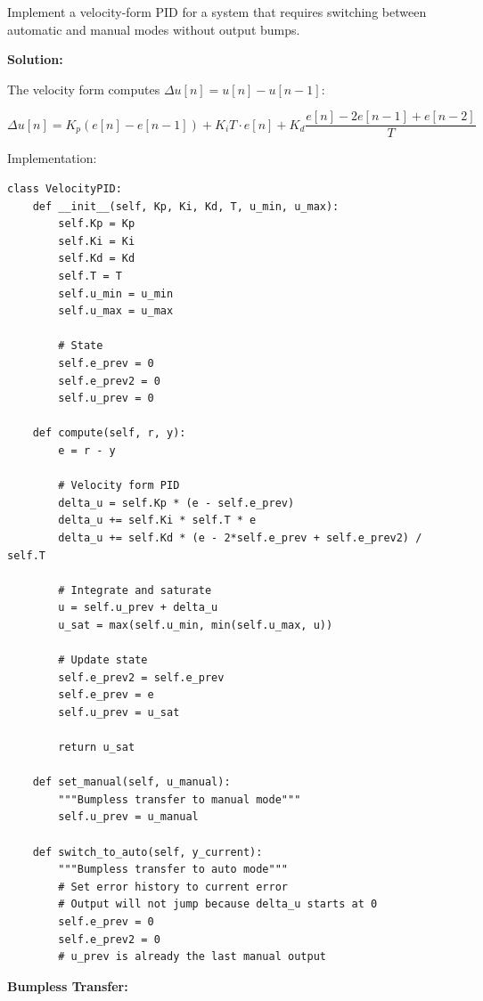 \begin{example}
\label{ex:velocity_pid}

Implement a velocity-form PID for a system that requires switching between automatic and manual modes without output bumps.

\textbf{Solution:}

The velocity form computes $\Delta u[n] = u[n] - u[n-1]$:

\begin{equation}
\Delta u[n] = K_p(e[n] - e[n-1]) + K_i T \cdot e[n] + K_d \frac{e[n] - 2e[n-1] + e[n-2]}{T}
\end{equation}

Implementation:

\begin{verbatim}
class VelocityPID:
    def __init__(self, Kp, Ki, Kd, T, u_min, u_max):
        self.Kp = Kp
        self.Ki = Ki
        self.Kd = Kd
        self.T = T
        self.u_min = u_min
        self.u_max = u_max

        # State
        self.e_prev = 0
        self.e_prev2 = 0
        self.u_prev = 0

    def compute(self, r, y):
        e = r - y

        # Velocity form PID
        delta_u = self.Kp * (e - self.e_prev)
        delta_u += self.Ki * self.T * e
        delta_u += self.Kd * (e - 2*self.e_prev + self.e_prev2) / self.T

        # Integrate and saturate
        u = self.u_prev + delta_u
        u_sat = max(self.u_min, min(self.u_max, u))

        # Update state
        self.e_prev2 = self.e_prev
        self.e_prev = e
        self.u_prev = u_sat

        return u_sat

    def set_manual(self, u_manual):
        """Bumpless transfer to manual mode"""
        self.u_prev = u_manual

    def switch_to_auto(self, y_current):
        """Bumpless transfer to auto mode"""
        # Set error history to current error
        # Output will not jump because delta_u starts at 0
        self.e_prev = 0
        self.e_prev2 = 0
        # u_prev is already the last manual output
\end{verbatim}

\textbf{Bumpless Transfer:}


\end{example}
